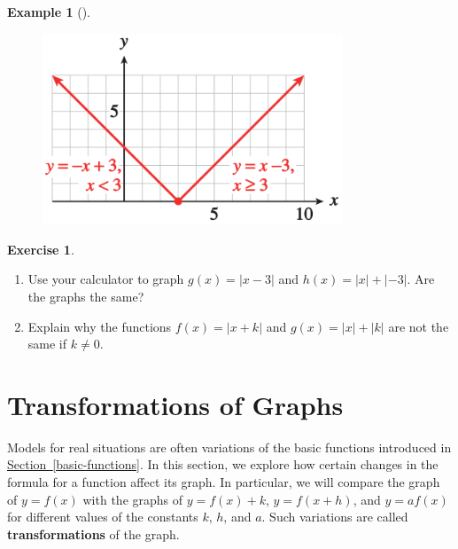 \documentclass[10pt,]{book}
\newcommand{\terminology}[1]{\textbf{#1}}
\theoremstyle{plain}
\theoremstyle{definition}
\newtheorem{exercise}[theorem]{Exercise}
\theoremstyle{definition}
\newtheorem{example}[theorem]{Example}
\numberwithin{equation}{section}
\newcommand\abs[1]{\left|#1\right|}
\begin{document}
\begin{example}[]
\begin{enumerate}[label=*\alph**]
            \leavevmode%
\begin{figure}
\centering
\includegraphics[width=0.80\textwidth,]{images/fig-piecewise2.svg}\caption{\label{fig-piecewise2}}
\end{figure}
\end{enumerate}
\end{example}
\begin{exercise}\label{exercise-piecewise2}
\leavevmode%
\begin{enumerate}[label=*\alph**]
\item\hypertarget{li-284}{}Use your calculator to graph \(g(x) =\abs{x−3}\) and \(h(x) =\abs{x} + \abs{−3}\). Are the graphs the same?\item\hypertarget{li-285}{}Explain why the functions \(f (x) =\abs{x + k}\) and \(g(x) =\abs{x} + \abs{k}\) are not the same if \(k\ne 0\).
        \end{enumerate}
\end{exercise}
\typeout{************************************************}
\typeout{************************************************}
\section[Transformations of Graphs]{Transformations of Graphs}\label{transformations}

    Models for real situations are often variations of the basic functions introduced in \hyperref[basic-functions]{Section~\ref{basic-functions}}. In this section, we explore how certain changes in the formula for a function affect its graph. In particular, we will compare the graph of \(y = f (x)\) with the graphs of \(y = f (x) + k\), \(y = f (x + h)\), and \(y = a f (x)\) for different values of the constants \(k\), \(h\), and \(a\). Such variations are called \terminology{transformations} of the graph.
%
\typeout{************************************************}
\typeout{************************************************}
\end{document}
